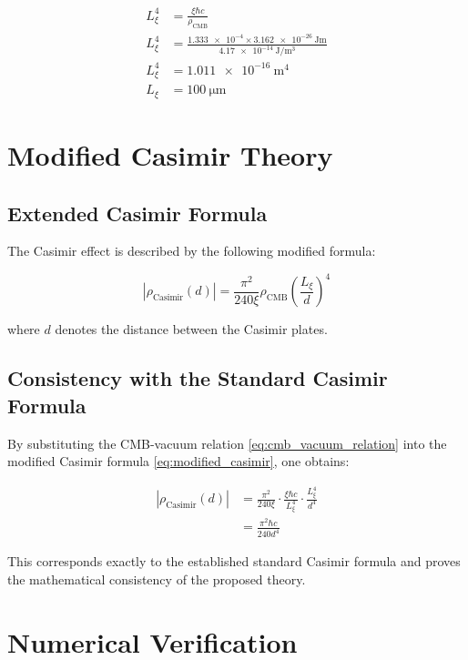 	\begin{align}
		L_\xi^4 &= \frac{\xi \hbar c}{\rho_{\text{CMB}}} \label{eq:Lxi_calculation}\\
		L_\xi^4 &= \frac{\num{1.333e-4} \times \SI{3.162e-26}{\joule\meter}}{\SI{4.17e-14}{\joule\per\meter^3}}\\
		L_\xi^4 &= \SI{1.011e-16}{\meter^4}\\
		L_\xi &= \SI{100}{\micro\meter} \label{eq:Lxi_result}
	\end{align}
	
	\section{Modified Casimir Theory}
	
	\subsection{Extended Casimir Formula}
	
	The Casimir effect is described by the following modified formula:
	
	\begin{equation}
		|\rho_{\text{Casimir}}(d)| = \frac{\pi^2}{240\xi} \rho_{\text{CMB}} \left( \frac{L_\xi}{d} \right)^4 \label{eq:modified_casimir}
	\end{equation}
	
	where \( d \) denotes the distance between the Casimir plates.
	
	\subsection{Consistency with the Standard Casimir Formula}
	
	By substituting the CMB-vacuum relation \eqref{eq:cmb_vacuum_relation} into the modified Casimir formula \eqref{eq:modified_casimir}, one obtains:
	
	\begin{align}
		|\rho_{\text{Casimir}}(d)| &= \frac{\pi^2}{240\xi} \cdot \frac{\xi \hbar c}{L_\xi^4} \cdot \frac{L_\xi^4}{d^4} \label{eq:casimir_substitution}\\
		&= \frac{\pi^2 \hbar c}{240 d^4} \label{eq:standard_casimir_recovered}
	\end{align}
	
	This corresponds exactly to the established standard Casimir formula and proves the mathematical consistency of the proposed theory.
	
	\section{Numerical Verification}
	

